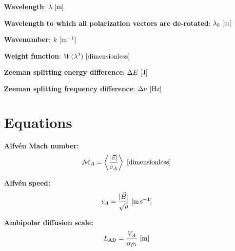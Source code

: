\documentclass[a4paper,10pt]{article}
\begin{document}
{\noindent}\textbf{Wavelength}: $\lambda~[{\rm m}]$

{\noindent}\textbf{Wavelength to which all polarization vectors are de-rotated}: $\lambda_0~[{\rm m}]$

{\noindent}\textbf{Wavenumber}: $k~[{\rm m^{-1}}]$

{\noindent}\textbf{Weight function}: $W(\lambda^2)~[\rm{dimensionless}]$

{\noindent}\textbf{Zeeman splitting energy difference}: $\Delta E ~ [{\rm J}]$

{\noindent}\textbf{Zeeman splitting frequency difference}: $\Delta \nu ~ [{\rm Hz}]$









































\newpage
\section{Equations}

{\noindent}\textbf{Alfv\'en Mach number:}
\begin{align*}
    \mathcal{M}_A = \left\langle\frac{\lvert\vec{v}\rvert}{v_A}\right\rangle ~ [{\rm dimensionless}]
\end{align*}

{\noindent}\textbf{Alfv\'en speed:}
\begin{align*}
    v_A = \frac{\lvert\vec{B}\lvert}{\sqrt{\rho}} ~ [{\rm m\,s^{-1}}]
\end{align*}

{\noindent}\textbf{Ambipolar diffusion scale:}
\begin{align*}
    L_\mathrm{AD} = \dfrac{V_A}{\alpha\rho_i} ~ [\rm m]
\end{align*}
\end{document}
